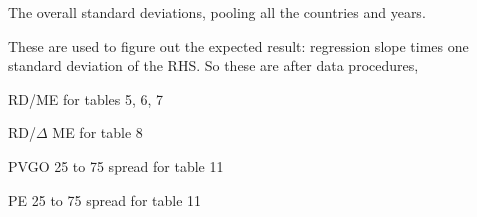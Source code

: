 

\usepackage[T1]{fontenc}




\thispagestyle{fancy}

\newcommand{\code}{\texttt}
\newcommand*{\Commonpath}{20190703}


The overall standard deviations, pooling all the countries and years.


These are used to figure out the expected result: regression slope times one standard deviation of the RHS. So these are after data procedures, 

RD/ME for tables 5, 6, 7

RD/$\Delta$ ME for table 8

PVGO 25 to 75 spread for table 11

PE 25 to 75 spread for table 11






